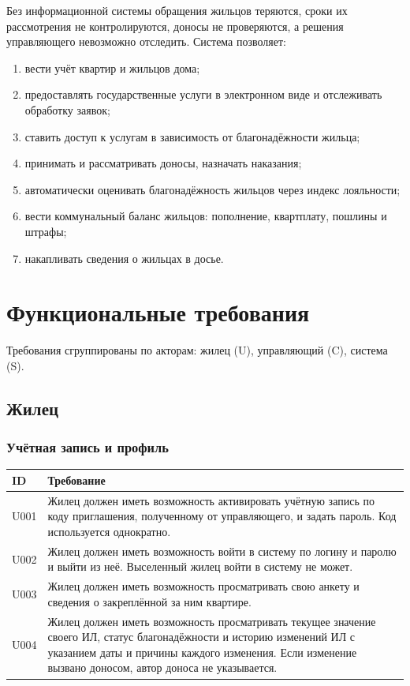 \documentclass[12pt,a4paper]{article}
\newenvironment{reqtable}{%
  \begin{longtable}{L{14mm} L{146mm}}
  \toprule
  \textbf{ID} & \textbf{Требование} \\
  \midrule
  \endhead
  \bottomrule
  \endfoot
}{\end{longtable}}
\begin{document}
Без информационной системы обращения жильцов теряются, сроки их
рассмотрения не контролируются, доносы не проверяются, а решения
управляющего невозможно отследить. Система позволяет:

\begin{enumerate}
  \item вести учёт квартир и жильцов дома;
  \item предоставлять государственные услуги в электронном виде и
        отслеживать обработку заявок;
  \item ставить доступ к услугам в зависимость от благонадёжности жильца;
  \item принимать и рассматривать доносы, назначать наказания;
  \item автоматически оценивать благонадёжность жильцов через индекс
        лояльности;
  \item вести коммунальный баланс жильцов: пополнение, квартплату, пошлины
        и штрафы;
  \item накапливать сведения о жильцах в досье.
\end{enumerate}

\section{Функциональные требования}

Требования сгруппированы по акторам: жилец (U), управляющий (C), система (S).

\subsection{Жилец}

\subsubsection*{Учётная запись и профиль}
\begin{reqtable}
U001 & Жилец должен иметь возможность активировать учётную запись по коду приглашения, полученному от управляющего, и задать пароль. Код используется однократно. \\
U002 & Жилец должен иметь возможность войти в систему по логину и паролю и выйти из неё. Выселенный жилец войти в систему не может. \\
U003 & Жилец должен иметь возможность просматривать свою анкету и сведения о закреплённой за ним квартире. \\
U004 & Жилец должен иметь возможность просматривать текущее значение своего ИЛ, статус благонадёжности и историю изменений ИЛ с указанием даты и причины каждого изменения. Если изменение вызвано доносом, автор доноса не указывается. \\
\end{reqtable}
\end{document}
